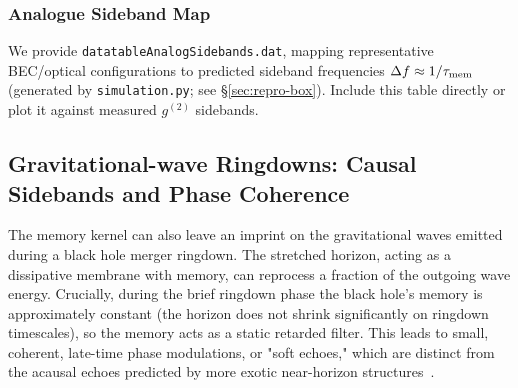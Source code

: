 \documentclass[11pt,a4paper]{article}
\theoremstyle{plain}
\theoremstyle{definition}
\theoremstyle{remark}
\begin{document}
\subsubsection{Analogue Sideband Map}
We provide \texttt{datatableAnalogSidebands.dat}, mapping representative BEC/optical
configurations to predicted sideband frequencies $\Delta f\approx 1/\tau_{\rm mem}$ (generated
by \texttt{simulation.py}; see \S\ref{sec:repro-box}). Include this table directly or plot it
against measured $g^{(2)}$ sidebands.


\subsection{Gravitational-wave Ringdowns: Causal Sidebands and Phase Coherence}
The memory kernel can also leave an imprint on the gravitational waves emitted during a black hole merger ringdown. The stretched horizon, acting as a dissipative membrane with memory, can reprocess a fraction of the outgoing wave energy. Crucially, during the brief ringdown phase the black hole's memory is approximately constant (the horizon does not shrink significantly on ringdown timescales), so the memory acts as a static retarded filter. This leads to small, coherent, late-time phase modulations, or "soft echoes," which are distinct from the acausal echoes predicted by more exotic near-horizon structures~\cite{Cardoso:2016, Abedi:2017}.
\end{document}
